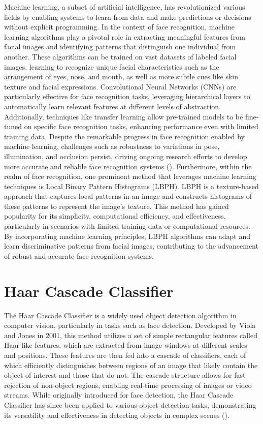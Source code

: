 \documentclass[
]{article}
\begin{document}
\begin{multicols}{2}
Machine learning, a subset of artificial intelligence, has revolutionized various fields by enabling systems to learn from data and make predictions or decisions without explicit programming. In the context of face recognition, machine learning algorithms play a pivotal role in extracting meaningful features from facial images and identifying patterns that distinguish one individual from another. These algorithms can be trained on vast datasets of labeled facial images, learning to recognize unique facial characteristics such as the arrangement of eyes, nose, and mouth, as well as more subtle cues like skin texture and facial expressions. Convolutional Neural Networks (CNNs) are particularly effective for face recognition tasks, leveraging hierarchical layers to automatically learn relevant features at different levels of abstraction. Additionally, techniques like transfer learning allow pre-trained models to be fine-tuned on specific face recognition tasks, enhancing performance even with limited training data. Despite the remarkable progress in face recognition enabled by machine learning, challenges such as robustness to variations in pose, illumination, and occlusion persist, driving ongoing research efforts to develop more accurate and reliable face recognition systems (\cite{schwarz2021machine}). Furthermore, within the realm of face recognition, one prominent method that leverages machine learning techniques is Local Binary Pattern Histograms (LBPH). LBPH is a texture-based approach that captures local patterns in an image and constructs histograms of these patterns to represent the image's texture. This method has gained popularity for its simplicity, computational efficiency, and effectiveness, particularly in scenarios with limited training data or computational resources. By incorporating machine learning principles, LBPH algorithms can adapt and learn discriminative patterns from facial images, contributing to the advancement of robust and accurate face recognition systems.

\section{Haar Cascade Classifier}
The Haar Cascade Classifier is a widely used object detection algorithm in computer vision, particularly in tasks such as face detection. Developed by Viola and Jones in 2001, this method utilizes a set of simple rectangular features called Haar-like features, which are extracted from image windows at different scales and positions. These features are then fed into a cascade of classifiers, each of which efficiently distinguishes between regions of an image that likely contain the object of interest and those that do not. The cascade structure allows for fast rejection of non-object regions, enabling real-time processing of images or video streams. While originally introduced for face detection, the Haar Cascade Classifier has since been applied to various object detection tasks, demonstrating its versatility and effectiveness in detecting objects in complex scenes (\cite{viola2004robust}).

\end{multicols}
\end{document}

